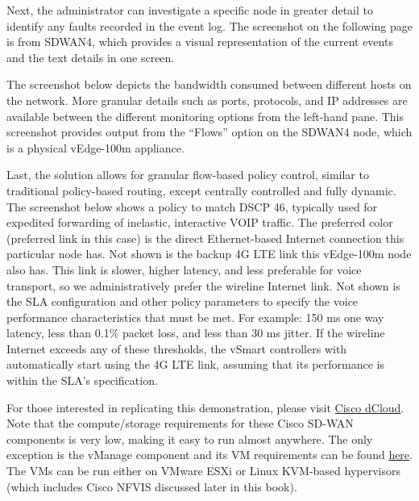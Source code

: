 
Next, the administrator can investigate a specific node in greater detail to
identify any faults recorded in the event log. The screenshot on the following
page is from SDWAN4, which provides a visual representation of the current
events and the text details in one screen.


The screenshot below depicts the bandwidth consumed between different hosts on
the network. More granular details such as ports, protocols, and IP addresses
are available between the different monitoring options from the left-hand
pane. This screenshot provides output from the ``Flows'' option on the SDWAN4
node, which is a physical vEdge-100m appliance.


Last, the solution allows for granular flow-based policy control, similar to
traditional policy-based routing, except centrally controlled and fully
dynamic. The screenshot below shows a policy to match DSCP 46, typically used
for expedited forwarding of inelastic, interactive VOIP traffic. The preferred
color (preferred link in this case) is the direct Ethernet-based Internet
connection this particular node has. Not shown is the backup 4G LTE link this
vEdge-100m node also has. This link is slower, higher latency, and less
preferable for voice transport, so we administratively prefer the wireline
Internet link. Not shown is the SLA configuration and other policy parameters
to specify the voice performance characteristics that must be met. For
example: 150 ms one way latency, less than 0.1\% packet loss, and less than 30
ms jitter. If the wireline Internet exceeds any of these thresholds, the
vSmart controllers with automatically start using the 4G LTE link, assuming
that its performance is within the SLA's specification.


For those interested in replicating this demonstration, please visit
\href{https://dcloud.cisco.com/}{Cisco dCloud}.
Note that the compute/storage requirements for these Cisco SD-WAN components
is very low, making it easy to run almost anywhere. The only exception is the
vManage component and its VM requirements can be found
\href{https://sdwan-docs.cisco.com/Product_Documentation/Getting_Started/Hardware_and_Software_Installation/Server_Hardware_Recommendations}{here}.
The VMs can be run either on VMware ESXi or Linux KVM-based hypervisors (which
includes Cisco NFVIS discussed later in this book).


